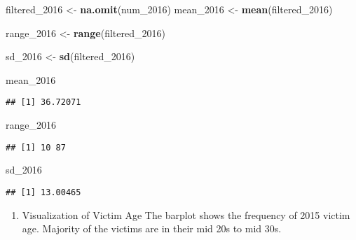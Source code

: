 \documentclass[
]{article}
\newenvironment{Shaded}{\begin{snugshade}}{\end{snugshade}}
\newcommand{\DecValTok}[1]{\textcolor[rgb]{0.00,0.00,0.81}{#1}}
\newcommand{\KeywordTok}[1]{\textcolor[rgb]{0.13,0.29,0.53}{\textbf{#1}}}
\newcommand{\NormalTok}[1]{#1}
\newcommand{\OperatorTok}[1]{\textcolor[rgb]{0.81,0.36,0.00}{\textbf{#1}}}
\newcommand{\StringTok}[1]{\textcolor[rgb]{0.31,0.60,0.02}{#1}}
\providecommand{\tightlist}{%
  \setlength{\itemsep}{0pt}\setlength{\parskip}{0pt}}
\begin{document}
\begin{Shaded}
\begin{Highlighting}[]
\NormalTok{filtered_}\DecValTok{2016}\NormalTok{ <-}\StringTok{ }\KeywordTok{na.omit}\NormalTok{(num_}\DecValTok{2016}\NormalTok{)}
\NormalTok{mean_}\DecValTok{2016}\NormalTok{ <-}\StringTok{ }\KeywordTok{mean}\NormalTok{(filtered_}\DecValTok{2016}\NormalTok{)}

\NormalTok{range_}\DecValTok{2016}\NormalTok{ <-}\StringTok{ }\KeywordTok{range}\NormalTok{(filtered_}\DecValTok{2016}\NormalTok{)}

\NormalTok{sd_}\DecValTok{2016}\NormalTok{ <-}\StringTok{ }\KeywordTok{sd}\NormalTok{(filtered_}\DecValTok{2016}\NormalTok{)}

\NormalTok{mean_}\DecValTok{2016}
\end{Highlighting}
\end{Shaded}

\begin{verbatim}
## [1] 36.72071
\end{verbatim}

\begin{Shaded}
\begin{Highlighting}[]
\NormalTok{range_}\DecValTok{2016}
\end{Highlighting}
\end{Shaded}

\begin{verbatim}
## [1] 10 87
\end{verbatim}

\begin{Shaded}
\begin{Highlighting}[]
\NormalTok{sd_}\DecValTok{2016}
\end{Highlighting}
\end{Shaded}

\begin{verbatim}
## [1] 13.00465
\end{verbatim}

\begin{enumerate}
\def\labelenumi{\arabic{enumi}.}
\setcounter{enumi}{4}
\tightlist
\item
  Visualization of Victim Age The barplot shows the frequency of 2015
  victim age. Majority of the victims are in their mid 20s to mid 30s.
\end{enumerate}

\begin{Shaded}
\end{Shaded}
\end{document}
